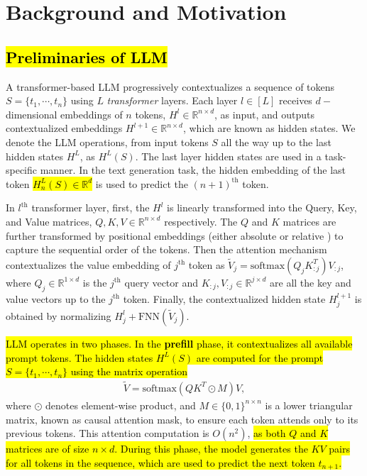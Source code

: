 \section{Background and Motivation}
\label{sec: background}

\subsection{\hl{Preliminaries of LLM}}
\label{sec: Preliminaries}
A transformer-based LLM progressively contextualizes a sequence of tokens $S=\{t_1, \cdots, t_n\}$ using $L$ \textit{transformer} layers. Each layer $l\in [L]$ receives $d-$dimensional embeddings of $n$ tokens, $H^l \in \mathbb{R}^{n\times d}$, as input, and outputs contextualized embeddings $H^{l+1} \in \mathbb{R}^{n\times d}$, which are known as hidden states. We denote the LLM operations, from input tokens $S$ all the way up to the last hidden states $H^L$, as $H^L(S)$.
The last layer hidden states are used in a task-specific manner. In the text generation task, the hidden embedding of the last token \hl{$H^L_{n}(S) \in \mathbb{R}^d$} is used to predict the $(n+1)^{\text{th}}$ token. 

In $l^{\text{th}}$ transformer layer, first, the $H^l$ is linearly transformed into the Query, Key, and Value matrices, $Q, K, V \in \mathbb{R}^{n\times d}$ respectively. 
The $Q$ and $K$ matrices are further transformed by positional embeddings (either absolute \cite{su2024roformer} or relative \cite{likhomanenko2021cape}) to capture the sequential order of the tokens.
Then the attention mechanism contextualizes the value embedding of $j^\text{th}$ token as $\tilde{V}_j = \mathrm{softmax}(Q_jK_{:j}^T) V_{:j}$, where $Q_j \in \mathbb{R}^{1\times d}$ is the $j^\text{th}$ query vector and $K_{:j}, V_{:j} \in \mathbb{R}^{j\times d}$ are all the key and value vectors up to the $j^\text{th}$ token. Finally, the contextualized hidden state $H^{l+1}_j$ is obtained by normalizing $H^l_j +  \mathrm{FNN}(\tilde{V}_j)$. 

\hl{LLM operates in two phases. In the \textbf{prefill} phase, it contextualizes all available prompt tokens. The hidden states $H^L(S)$ are computed for the prompt $S=\{t_1, \cdots, t_n\}$ using the matrix operation}
\begin{align}\label{eq:attn}
    \tilde{V} = \mathrm{softmax}(QK^T \odot M)V,
\end{align}
where $\odot$ denotes element-wise product, and $M \in \{0,1\}^{n\times n}$ is a lower triangular matrix, known as causal attention mask, to ensure each token attends only to its previous tokens. This attention computation is $O(n^2)$, \hl{as both $Q$ and $K$ matrices are of size $n\times d$.
 During this phase, the model generates the $KV$ pairs for all tokens in the sequence, which are used to predict the next token $t_{n+1}$.}
 
